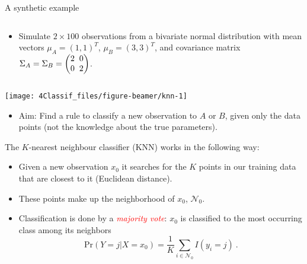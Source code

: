 \documentclass[10pt,ignorenonframetext,]{beamer}
\providecommand{\tightlist}{%
  \setlength{\itemsep}{0pt}\setlength{\parskip}{0pt}}
\begin{document}
\begin{frame}

\begin{block}{A synthetic example}

\(~\)

\begin{itemize}
\tightlist
\item
  Simulate \(2\times 100\) observations from a bivariate normal
  distribution with mean vectors \(\mu_A = (1, 1)^T\),
  \(\mu_B = (3, 3)^T\), and covariance matrix
  \(\Sigma_A = \Sigma_B = \begin{pmatrix} 2\hspace{2mm} 0 \\ 0 \hspace{2mm} 2 \end{pmatrix}\).
\end{itemize}

\(~\)

\begin{center}\texttt{[image: 4Classif\_files/figure-beamer/knn-1]} \end{center}

\vspace{2mm}

\begin{itemize}
\tightlist
\item
  Aim: Find a rule to classify a new observation to \(A\) or \(B\),
  given only the data points (not the knowledge about the true
  parameters).
\end{itemize}

\end{block}

\end{frame}

\begin{frame}

\vspace{2mm}

The \(K\)-nearest neighbour classifier (KNN) works in the following way:

\begin{itemize}
\item
  Given a new observation \(x_0\) it searches for the \(K\) points in
  our training data that are closest to it (Euclidean distance).
  \vspace{1mm}
\item
  These points make up the neighborhood of \(x_0\), \(\mathcal{N}_0\).
  \vspace{1mm}
\item
  Classification is done by a \emph{\textcolor{red}{majority vote}}:
  \(x_0\) is classified to the most occurring class among its neighbors
  \[\text{Pr}(Y=j | X = x_0) = \frac{1}{K} \sum_{i \in \mathcal{N}_0} I(y_i = j)\ .\]
\end{itemize}

\end{frame}
\end{document}
